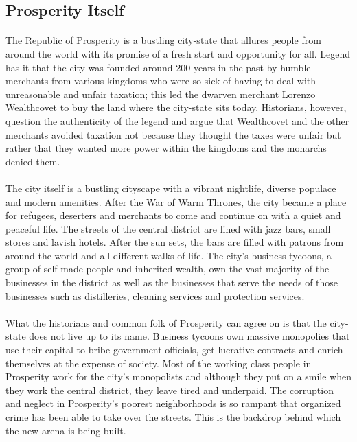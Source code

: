 \subsection{Prosperity Itself}

\paragraph{} The Republic of Prosperity is a bustling city-state that allures people from around the world with its promise of a fresh start and opportunity for all. Legend has it that the city was founded around 200 years in the past by humble merchants from various kingdoms who were so sick of having to deal with unreasonable and unfair taxation; this led the dwarven merchant Lorenzo Wealthcovet to buy the land where the city-state sits today. Historians, however, question the authenticity of the legend and argue that Wealthcovet and the other merchants avoided taxation not because they thought the taxes were unfair but rather that they wanted more power within the kingdoms and the monarchs denied them.

\paragraph{} The city itself is a bustling cityscape with a vibrant nightlife, diverse populace and modern amenities. After the War of Warm Thrones, the city became a place for refugees, deserters and merchants to come and continue on with a quiet and peaceful life. The streets of the central district are lined with jazz bars, small stores and lavish hotels. After the sun sets, the bars are filled with patrons from around the world and all different walks of life. The city's business tycoons, a group of self-made people and inherited wealth, own the vast majority of the businesses in the district as well as the businesses that serve the needs of those businesses such as distilleries, cleaning services and protection services.

\paragraph{} What the historians and common folk of Prosperity can agree on is that the city-state does not live up to its name. Business tycoons own massive monopolies that use their capital to bribe government officials, get lucrative contracts and enrich themselves at the expense of society. Most of the working class people in Prosperity work for the city's monopolists and although they put on a smile when they work the central district, they leave tired and underpaid. The corruption and neglect in Prosperity's poorest neighborhoods is so rampant that organized crime has been able to take over the streets. This is the backdrop behind which the new arena is being built.

